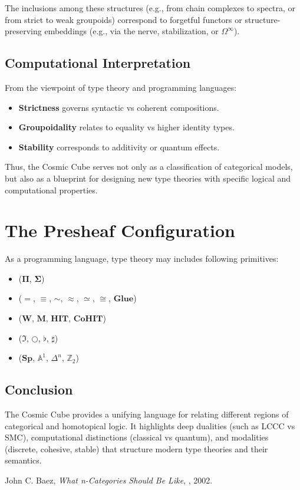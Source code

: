 \documentclass{article}
\begin{document}
The inclusions among these structures (e.g., from chain
complexes to spectra, or from strict to weak groupoids)
correspond to forgetful functors or structure-preserving
embeddings (e.g., via the nerve, stabilization, or $\Omega^\infty$).

\subsection{Computational Interpretation}

From the viewpoint of type theory and programming languages:

\begin{itemize}
\item \textbf{Strictness} governs syntactic vs coherent compositions.
\item \textbf{Groupoidality} relates to equality vs higher identity types.
\item \textbf{Stability} corresponds to additivity or quantum effects.
\end{itemize}

Thus, the Cosmic Cube serves not only as a classification of categorical models, but also as a blueprint for designing new type theories with specific logical and computational properties.

\section{The Presheaf Configuration}

As a programming language, type theory may includes following primitives:

\begin{itemize}
\item {} ($\mathbf{\Pi}$, $\mathbf{\Sigma}$)
\item {} ($\mathbf{=}$, $\mathbf{\equiv}$, $\mathbf{\sim}$, $\mathbf{\approx}$, $\mathbf{\simeq}$, $\mathbf{\cong}$, $\mathbf{Glue}$)
\item {} ($\mathbf{W}$, $\mathbf{M}$, $\mathbf{HIT}$, $\mathbf{CoHIT}$)
\item {} ($\Im$, $\bigcirc$, $\flat$, $\sharp$)
\item {} ($\mathbf{Sp}$, $\mathbb{A}^1$, $\mathbb{\Delta}^n$, $\mathbb{Z}_2$)
\end{itemize}

\subsection{Conclusion}
The Cosmic Cube provides a unifying language for relating different regions
of categorical and homotopical logic. It highlights deep dualities (such as
LCCC vs SMC), computational distinctions (classical vs quantum),
and modalities (discrete, cohesive, stable) that structure modern
type theories and their semantics.

\begin{thebibliography}{9}
 John C. Baez, \emph{What n-Categories Should Be Like}, , 2002.
\end{thebibliography}
\end{document}
